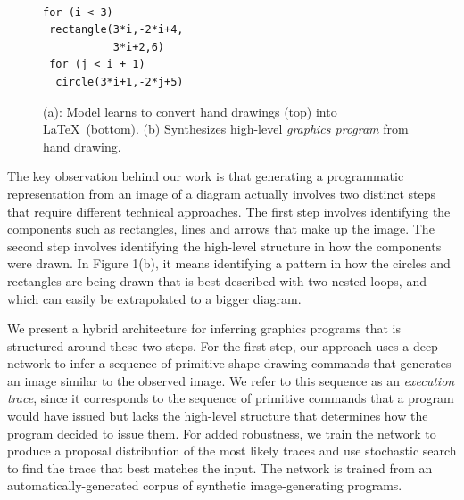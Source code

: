 \documentclass{article}
\begin{document}
\begin{figure}[h]
\begin{minipage}[t]{0.7\linewidth}
\begin{tabular}{llll}
\end{tabular}
\subcaption{}
  \end{minipage}%
  \begin{minipage}[t]{0.3\linewidth}
    \\
    \begin{minipage}[t]{0.3\linewidth}
\begin{Verbatim}
for (i < 3)
 rectangle(3*i,-2*i+4,
           3*i+2,6)
 for (j < i + 1)
  circle(3*i+1,-2*j+5)
\end{Verbatim}      
      \end{minipage}
    \subcaption{}
  \end{minipage}
  \caption{(a): Model learns to convert hand drawings (top) into \LaTeX~(bottom). (b) Synthesizes high-level \emph{graphics program} from hand drawing.}\label{firstPageExamples}
\end{figure}

The key observation behind our work is that generating a programmatic representation from an image of a diagram actually involves two distinct steps that require different technical approaches. The first step involves identifying the components such as rectangles, lines and arrows that make up the image. The second step involves identifying the high-level structure in how the components were drawn. In Figure 1(b), it means identifying a pattern in how the circles and rectangles are being drawn that is best described with two nested loops, and which can easily be extrapolated to a bigger diagram. 

We present a hybrid architecture for inferring graphics programs that is structured around these two steps. For the first step, our approach uses a deep network to infer a sequence of primitive shape-drawing commands that generates an image similar to the observed image. We refer to this sequence as an \emph{execution trace}, since it corresponds to the sequence of primitive commands that a program would have issued but lacks the high-level structure that determines how the program decided to issue them. For added robustness, we train the network to produce a proposal distribution of the most likely traces and use stochastic search to find the trace that best matches the input. The network is trained from an automatically-generated corpus of synthetic image-generating programs.
\end{document}
